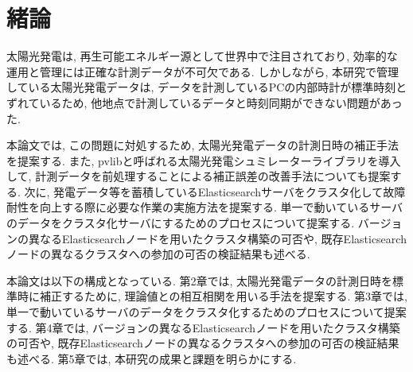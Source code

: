 \chapter{緒論}
\label{chap:first}

太陽光発電は, 再生可能エネルギー源として世界中で注目されており, 効率的な運用と管理には正確な計測データが不可欠である. しかしながら, 本研究で管理している太陽光発電データは, データを計測しているPCの内部時計が標準時刻とずれているため, 他地点で計測しているデータと時刻同期ができない問題があった.

本論文では, この問題に対処するため, 太陽光発電データの計測日時の補正手法を提案する. また, pvlibと呼ばれる太陽光発電シュミレーターライブラリを導入して, 計測データを前処理することによる補正誤差の改善手法についても提案する.
次に, 発電データ等を蓄積しているElasticsearchサーバをクラスタ化して故障耐性を向上する際に必要な作業の実施方法を提案する. 単一で動いているサーバのデータをクラスタ化サーバにするためのプロセスについて提案する. バージョンの異なるElasticsearchノードを用いたクラスタ構築の可否や, 既存Elasticsearchノードの異なるクラスタへの参加の可否の検証結果も述べる. 

本論文は以下の構成となっている. 第2章では, 太陽光発電データの計測日時を標準時に補正するために, 理論値との相互相関を用いる手法を提案する. 第3章では, 単一で動いているサーバのデータをクラスタ化するためのプロセスについて提案する. 第4章では, バージョンの異なるElasticsearchノードを用いたクラスタ構築の可否や, 既存Elasticsearchノードの異なるクラスタへの参加の可否の検証結果も述べる. 第5章では, 本研究の成果と課題を明らかにする.